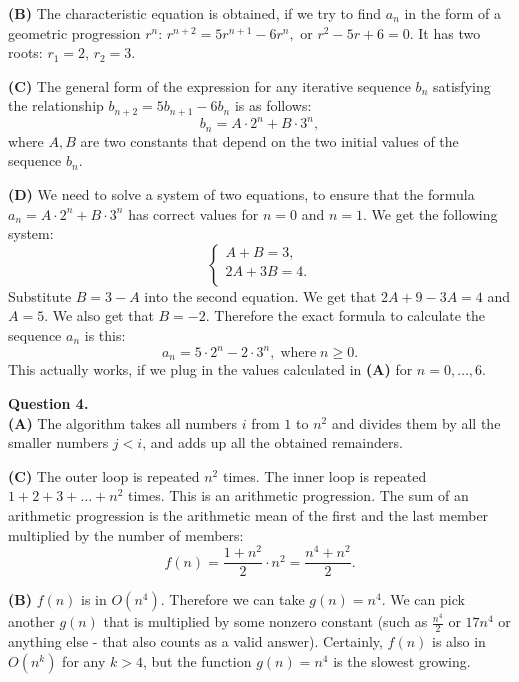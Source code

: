 \documentclass[jou]{apa6}
\begin{document}
{\bf (B)} The characteristic equation is obtained, if we try to find $a_n$ 
in the form of a geometric progression $r^n$:   
$r^{n+2} = 5r^{n+1} - 6r^n,$ or  
$r^2 -5r + 6 = 0$.   
It has two roots: $r_1 = 2$, $r_2 = 3$. 

{\bf (C)} The general form of the expression for any iterative
sequence $b_n$ satisfying the relationship $b_{n+2} = 5b_{n+1} - 6b_n$ is as follows:
$$b_n = A \cdot 2^n + B \cdot 3^n,$$
where $A,B$ are two constants that depend on the two initial values of the sequence $b_n$. 

{\bf (D)} We need to solve a system of two equations, to ensure that the formula
$a_n = A \cdot 2^n + B \cdot 3^n$ has correct values for $n=0$ and $n=1$. 
We get the following system: 
$$\left\{ \begin{array}{l} 
A + B = 3,\\
2A + 3B = 4.\\
\end{array} \right.$$
Substitute $B = 3-A$ into the second equation. We get that 
$2A + 9 - 3A = 4$ and $A = 5$. We also get that $B = -2$. 
Therefore the exact formula to calculate the sequence $a_n$ is this:
$$a_n  = 5 \cdot 2^n - 2 \cdot 3^n,\;\text{where}\;n \geq 0.$$
This actually works, if we plug in the values calculated in {\bf (A)} for $n = 0,\ldots,6$.




\vspace{10pt}
{\bf Question 4.}\\
{\bf (A)} The algorithm takes all numbers $i$ from $1$ to $n^2$ and
divides them by all the smaller numbers $j < i$, and adds up all the obtained remainders.

{\bf (C)} The outer loop is repeated $n^2$ times. The inner loop is repeated
$1 + 2 + 3 + \ldots + n^2$ times. This is an arithmetic progression.
The sum of an arithmetic progression is the arithmetic mean of the first and the last 
member multiplied by the number of members: 
$$f(n) = \frac{1 + n^2}{2} \cdot n^2 = \frac{n^4 + n^2}{2}.$$

{\bf (B)} $f(n)$ is in $O(n^4)$. Therefore we can take $g(n) = n^4$. We can
pick another $g(n)$ that is multiplied by some nonzero constant
(such as $\frac{n^4}{2}$ or $17n^4$ or anything else - that also counts
as a valid answer).  
Certainly, $f(n)$ is also in $O(n^k)$ for any $k > 4$, but the function $g(n) = n^4$ 
is the slowest growing. 
\end{document}
